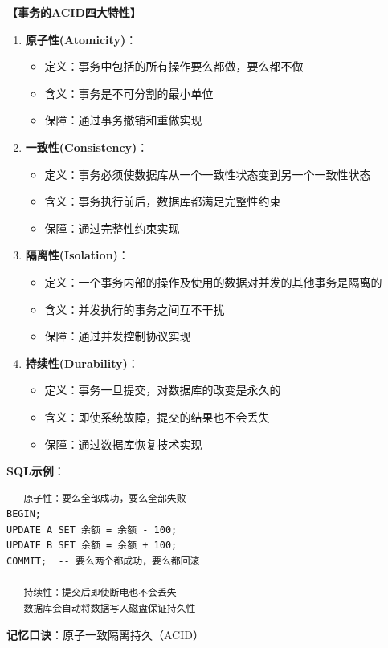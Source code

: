 \documentclass[12pt, a4paper]{article}
\newenvironment{bluebox}[1]{%
  \begin{trivlist}
  \item[\hskip\labelsep \textbf{#1}]
  \setlength{\parskip}{0.5ex}
  \setlength{\itemsep}{0.5ex}
}{%
  \end{trivlist}
  }
\begin{document}
\begin{bluebox}{ACID特性}
	\textbf{【事务的ACID四大特性】}

	\begin{enumerate}[leftmargin=*, label=\textbf{\arabic*.}]
		\item \textbf{原子性(Atomicity)}：
		      \begin{itemize}[nosep]
			      \item 定义：事务中包括的所有操作要么都做，要么都不做
			      \item 含义：事务是不可分割的最小单位
			      \item 保障：通过事务撤销和重做实现
		      \end{itemize}

		\item \textbf{一致性(Consistency)}：
		      \begin{itemize}[nosep]
			      \item 定义：事务必须使数据库从一个一致性状态变到另一个一致性状态
			      \item 含义：事务执行前后，数据库都满足完整性约束
			      \item 保障：通过完整性约束实现
		      \end{itemize}

		\item \textbf{隔离性(Isolation)}：
		      \begin{itemize}[nosep]
			      \item 定义：一个事务内部的操作及使用的数据对并发的其他事务是隔离的
			      \item 含义：并发执行的事务之间互不干扰
			      \item 保障：通过并发控制协议实现
		      \end{itemize}

		\item \textbf{持续性(Durability)}：
		      \begin{itemize}[nosep]
			      \item 定义：事务一旦提交，对数据库的改变是永久的
			      \item 含义：即使系统故障，提交的结果也不会丢失
			      \item 保障：通过数据库恢复技术实现
		      \end{itemize}
	\end{enumerate}

	\textbf{SQL示例}：
	\begin{verbatim}
-- 原子性：要么全部成功，要么全部失败
BEGIN;
UPDATE A SET 余额 = 余额 - 100;
UPDATE B SET 余额 = 余额 + 100;
COMMIT;  -- 要么两个都成功，要么都回滚

-- 持续性：提交后即使断电也不会丢失
-- 数据库会自动将数据写入磁盘保证持久性
	\end{verbatim}

	\textbf{记忆口诀}：原子一致隔离持久（ACID）
\end{bluebox}
\end{document}

